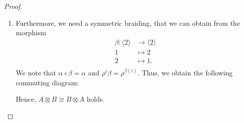 \begin{proof}
\begin{enumerate}
     \item Furthermore, we need a symmetric braiding, that we can obtain from
     the morphism 
     \begin{align*}
         \beta \colon \langle 2 \rangle &\to \langle 2 \rangle \\
         1 &\mapsto 2 \\
         2 &\mapsto 1. \\
     \end{align*}
     We note that $\alpha \circ \beta = \alpha$ and $\rho^i \beta =
     \rho^{\beta(i)}$. Thus, we obtain the following commuting diagram:
     \begin{center}
     \end{center}
     Hence, $A \otimes B \cong B \otimes A$ holds.
     

\end{enumerate}
\end{proof}
